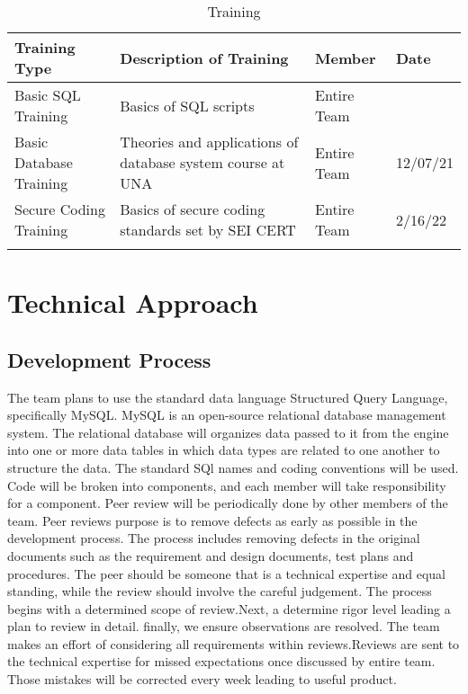 \documentclass[letterpaper,12pt,oneside,listof=totoc]{scrreprt}
\begin{document}
\begin{longtable}{| p{} | p{} | p{} | p{} |} 
    \hline
    \textbf{Training Type} & \textbf{Description of Training} & \textbf{Member} & \textbf{Date}\\ 
    \hline
    Basic SQL Training & Basics of SQL scripts & Entire Team & \\
    \hline 
    Basic Database Training & Theories and applications of database system course at UNA & Entire Team & 12/07/21\\
    \hline 
    Secure Coding Training & Basics of secure coding standards set by SEI CERT & Entire Team & 2/16/22\\
    \hline 
\caption{Training}
\end{longtable}



\chapter{Technical Approach} %

\section{Development Process}
The team plans to use the standard data language Structured Query Language, specifically MySQL. MySQL is an open-source relational database management system. The relational database will organizes data passed to it from the engine into one or more data tables in which data types are related to one another to structure the data. The standard SQl names and coding conventions will be used. Code will be broken into components, and each member will take responsibility for a component. 
Peer review will be periodically done by other members of the team.
Peer reviews purpose is to remove defects as early as possible in the development process. The process includes removing defects in the original documents such as the requirement and design documents, test plans and procedures.
The peer should be someone that is a technical expertise and equal standing, while the review should involve the careful judgement. The process begins with a determined scope of review.Next, a determine rigor level leading a plan to review in detail. finally, we ensure observations are resolved.
The team makes an effort of considering all requirements within reviews.Reviews are sent to the technical expertise for missed expectations once discussed by entire team. Those mistakes will be corrected every week leading to useful product.
\end{document}
